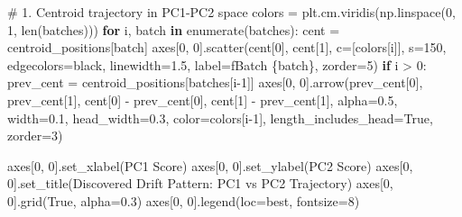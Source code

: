 \documentclass[
  letterpaper,
  DIV=11,
  numbers=noendperiod]{scrartcl}
\newenvironment{Shaded}{\begin{snugshade}}{\end{snugshade}}
\newcommand{\BuiltInTok}[1]{\textcolor[rgb]{0.00,0.23,0.31}{#1}}
\newcommand{\CommentTok}[1]{\textcolor[rgb]{0.37,0.37,0.37}{#1}}
\newcommand{\ControlFlowTok}[1]{\textcolor[rgb]{0.00,0.23,0.31}{\textbf{#1}}}
\newcommand{\DecValTok}[1]{\textcolor[rgb]{0.68,0.00,0.00}{#1}}
\newcommand{\FloatTok}[1]{\textcolor[rgb]{0.68,0.00,0.00}{#1}}
\newcommand{\KeywordTok}[1]{\textcolor[rgb]{0.00,0.23,0.31}{\textbf{#1}}}
\newcommand{\NormalTok}[1]{\textcolor[rgb]{0.00,0.23,0.31}{#1}}
\newcommand{\OperatorTok}[1]{\textcolor[rgb]{0.37,0.37,0.37}{#1}}
\newcommand{\SpecialCharTok}[1]{\textcolor[rgb]{0.37,0.37,0.37}{#1}}
\newcommand{\SpecialStringTok}[1]{\textcolor[rgb]{0.13,0.47,0.30}{#1}}
\newcommand{\StringTok}[1]{\textcolor[rgb]{0.13,0.47,0.30}{#1}}
\newcommand{\VariableTok}[1]{\textcolor[rgb]{0.07,0.07,0.07}{#1}}
\renewenvironment{Shaded}{%
  \begin{tcolorbox}[%
    enhanced,%
    colback=codebg,%
    colframe=codebg,%
    borderline west={3pt}{0pt}{sectionblue},%
    fontupper=\small\ttfamily,%
    boxrule=0pt,%
    arc=0pt,%
    boxsep=5pt,%
    left=2mm,%
    right=2mm,%
    top=2mm,%
    bottom=2mm%
  ]%
}{%
  \end{tcolorbox}%
}
\begin{document}
\begin{Shaded}
\begin{Highlighting}[]
\CommentTok{\# 1. Centroid trajectory in PC1{-}PC2 space}
\NormalTok{colors }\OperatorTok{=}\NormalTok{ plt.cm.viridis(np.linspace(}\DecValTok{0}\NormalTok{, }\DecValTok{1}\NormalTok{, }\BuiltInTok{len}\NormalTok{(batches)))}
\ControlFlowTok{for}\NormalTok{ i, batch }\KeywordTok{in} \BuiltInTok{enumerate}\NormalTok{(batches):}
\NormalTok{    cent }\OperatorTok{=}\NormalTok{ centroid\_positions[batch]}
\NormalTok{    axes[}\DecValTok{0}\NormalTok{, }\DecValTok{0}\NormalTok{].scatter(cent[}\DecValTok{0}\NormalTok{], cent[}\DecValTok{1}\NormalTok{], c}\OperatorTok{=}\NormalTok{[colors[i]], s}\OperatorTok{=}\DecValTok{150}\NormalTok{, }
\NormalTok{                      edgecolors}\OperatorTok{=}\StringTok{\textquotesingle{}black\textquotesingle{}}\NormalTok{, linewidth}\OperatorTok{=}\FloatTok{1.5}\NormalTok{, label}\OperatorTok{=}\SpecialStringTok{f\textquotesingle{}Batch }\SpecialCharTok{\{}\NormalTok{batch}\SpecialCharTok{\}}\SpecialStringTok{\textquotesingle{}}\NormalTok{, zorder}\OperatorTok{=}\DecValTok{5}\NormalTok{)}
    \ControlFlowTok{if}\NormalTok{ i }\OperatorTok{\textgreater{}} \DecValTok{0}\NormalTok{:}
\NormalTok{        prev\_cent }\OperatorTok{=}\NormalTok{ centroid\_positions[batches[i}\OperatorTok{{-}}\DecValTok{1}\NormalTok{]]}
\NormalTok{        axes[}\DecValTok{0}\NormalTok{, }\DecValTok{0}\NormalTok{].arrow(prev\_cent[}\DecValTok{0}\NormalTok{], prev\_cent[}\DecValTok{1}\NormalTok{], }
\NormalTok{                        cent[}\DecValTok{0}\NormalTok{] }\OperatorTok{{-}}\NormalTok{ prev\_cent[}\DecValTok{0}\NormalTok{], cent[}\DecValTok{1}\NormalTok{] }\OperatorTok{{-}}\NormalTok{ prev\_cent[}\DecValTok{1}\NormalTok{],}
\NormalTok{                        alpha}\OperatorTok{=}\FloatTok{0.5}\NormalTok{, width}\OperatorTok{=}\FloatTok{0.1}\NormalTok{, head\_width}\OperatorTok{=}\FloatTok{0.3}\NormalTok{, }
\NormalTok{                        color}\OperatorTok{=}\NormalTok{colors[i}\OperatorTok{{-}}\DecValTok{1}\NormalTok{], length\_includes\_head}\OperatorTok{=}\VariableTok{True}\NormalTok{, zorder}\OperatorTok{=}\DecValTok{3}\NormalTok{)}

\NormalTok{axes[}\DecValTok{0}\NormalTok{, }\DecValTok{0}\NormalTok{].set\_xlabel(}\StringTok{\textquotesingle{}PC1 Score\textquotesingle{}}\NormalTok{)}
\NormalTok{axes[}\DecValTok{0}\NormalTok{, }\DecValTok{0}\NormalTok{].set\_ylabel(}\StringTok{\textquotesingle{}PC2 Score\textquotesingle{}}\NormalTok{)}
\NormalTok{axes[}\DecValTok{0}\NormalTok{, }\DecValTok{0}\NormalTok{].set\_title(}\StringTok{\textquotesingle{}Discovered Drift Pattern: PC1 vs PC2 Trajectory\textquotesingle{}}\NormalTok{)}
\NormalTok{axes[}\DecValTok{0}\NormalTok{, }\DecValTok{0}\NormalTok{].grid(}\VariableTok{True}\NormalTok{, alpha}\OperatorTok{=}\FloatTok{0.3}\NormalTok{)}
\NormalTok{axes[}\DecValTok{0}\NormalTok{, }\DecValTok{0}\NormalTok{].legend(loc}\OperatorTok{=}\StringTok{\textquotesingle{}best\textquotesingle{}}\NormalTok{, fontsize}\OperatorTok{=}\DecValTok{8}\NormalTok{)}


\end{Highlighting}
\end{Shaded}
\end{document}
